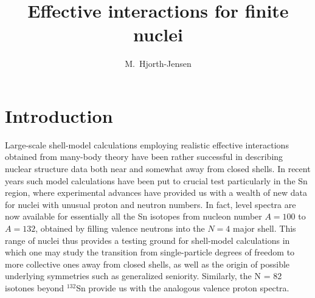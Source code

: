 



\newcommand{\stt}{\small\tt}


\begin{opening}
\title{Effective interactions for finite nuclei}


\author{M.~Hjorth-Jensen}

\end{opening}





\section{Introduction}
Large-scale shell-model calculations employing realistic effective 
interactions obtained from many-body theory have been rather successful 
in describing nuclear structure data both near and somewhat away from 
closed shells. In recent years such model calculations have been put 
to crucial test particularly in the Sn region, where experimental 
advances have provided us with a wealth of new data for nuclei 
with unusual proton and neutron numbers. In  fact, level spectra 
are now available for essentially all the Sn isotopes from 
nucleon number $A = 100$ to $A = 132$, obtained by filling valence 
neutrons into the $N = 4$ major shell. This range of nuclei thus provides a 
testing ground for shell-model calculations in which one may study 
the transition from single-particle degrees of freedom to 
more collective ones away from closed shells, as well 
as the origin of possible underlying symmetries such as 
generalized seniority. Similarly, the N = 82 isotones beyond $^{132}$Sn 
provide us with the analogous valence proton spectra. 

